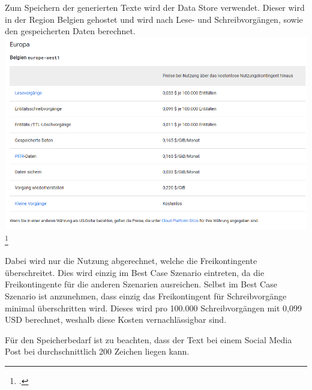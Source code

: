 Zum Speichern der generierten Texte wird der Data Store verwendet.
Dieser wird in der Region Belgien gehostet und wird nach Lese- und Schreibvorgängen, sowie den gespeicherten Daten berechnet.
\includegraphics{abbildungen/kostendatastore}
\footcite{GoogleDatastorePricing2025}

Dabei wird nur die Nutzung abgerechnet, welche die Freikontingente überschreitet.
Dies wird einzig im Best Case Szenario eintreten, da die Freikontingente für die anderen Szenarien ausreichen.
Selbst im Best Case Szenario ist anzunehmen, dass einzig das Freikontingent für Schreibvorgänge minimal überschritten wird.
Dieses wird pro 100.000 Schreibvorgängen mit 0,099 USD berechnet, weshalb diese Kosten vernachlässigbar sind.

Für den Speicherbedarf ist zu beachten, dass der Text bei einem Social Media Post bei durchschnittlich 200 Zeichen liegen kann.

